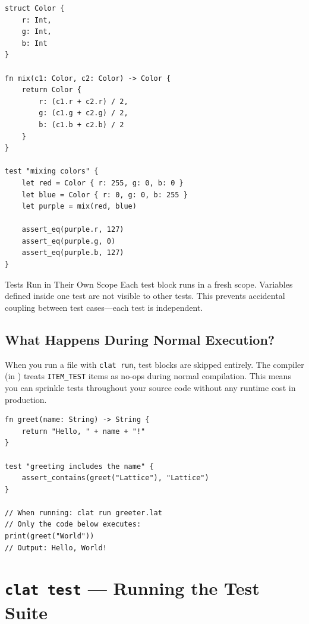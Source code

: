 \begin{lstlisting}[language=Lattice, caption={Tests have access to all module-level definitions}]
struct Color {
    r: Int,
    g: Int,
    b: Int
}

fn mix(c1: Color, c2: Color) -> Color {
    return Color {
        r: (c1.r + c2.r) / 2,
        g: (c1.g + c2.g) / 2,
        b: (c1.b + c2.b) / 2
    }
}

test "mixing colors" {
    let red = Color { r: 255, g: 0, b: 0 }
    let blue = Color { r: 0, g: 0, b: 255 }
    let purple = mix(red, blue)

    assert_eq(purple.r, 127)
    assert_eq(purple.g, 0)
    assert_eq(purple.b, 127)
}
\end{lstlisting}

\begin{notebox}{Tests Run in Their Own Scope}
Each test block runs in a fresh scope.
Variables defined inside one test are not visible to other tests.
This prevents accidental coupling between test cases---each test is independent.
\end{notebox}

\subsection{What Happens During Normal Execution?}\label{sec:tests-normal-exec}

When you run a file with \lstinline|clat run|, test blocks are skipped entirely.
The compiler (in ) treats \lstinline|ITEM_TEST| items as no-ops during normal compilation.
This means you can sprinkle tests throughout your source code without any runtime cost in production.

\begin{lstlisting}[language=Lattice, caption={Tests are invisible during normal execution}]
fn greet(name: String) -> String {
    return "Hello, " + name + "!"
}

test "greeting includes the name" {
    assert_contains(greet("Lattice"), "Lattice")
}

// When running: clat run greeter.lat
// Only the code below executes:
print(greet("World"))
// Output: Hello, World!
\end{lstlisting}

\section{\texttt{clat test} --- Running the Test Suite}\label{sec:clat-test}

